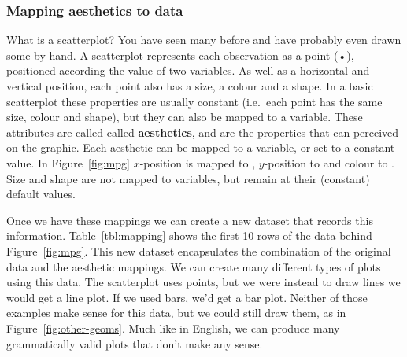 % 
% 


\subsubsection{Mapping aesthetics to data}

What is a scatterplot?  You have seen many before and have probably even drawn some by hand.  A scatterplot represents each observation as a point (•), positioned according the value of two variables.  As well as a horizontal and vertical position, each point also has a size, a colour and a shape. In a basic scatterplot these properties are usually constant (i.e.\ each point has the same size, colour and shape), but they can also be mapped to a variable.  These attributes are called called {\bf aesthetics}, and are the properties that can perceived on the graphic.  Each aesthetic can be mapped to a variable, or set to a constant value.  In Figure~\ref{fig:mpg} $x$-position is mapped to , $y$-position to  and colour to .  Size and shape are not mapped to variables, but remain at their (constant) default values.  

Once we have these mappings we can create a new dataset that records this information.  Table~\ref{tbl:mapping} shows the first 10 rows of the data behind Figure~\ref{fig:mpg}.  This new dataset encapsulates the combination of the original data and the aesthetic mappings.  We can create many different types of plots using this data.  The scatterplot uses points, but we were instead to draw lines we would get a line plot.  If we used bars, we'd get a bar plot.  Neither of those examples make sense for this data, but we could still draw them, as in Figure~\ref{fig:other-geoms}.  Much like in English, we can produce many grammatically valid plots that don't make any sense.


